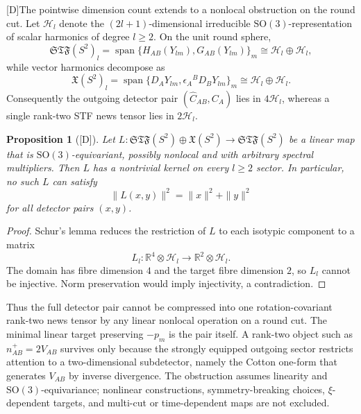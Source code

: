 \documentclass[11pt,a4paper]{article}
\newtheorem{proposition}[theorem]{Proposition}
\newcommand{\statusD}{\textsf{[D]}}
\begin{document}
\statusD The pointwise dimension count extends to a nonlocal obstruction on the round cut.  Let \(\mathcal H_l\) denote the \((2l+1)\)-dimensional irreducible \(\mathrm{SO}(3)\)-representation of scalar harmonics of degree \(l\ge2\).  On the unit round sphere,
\begin{equation}
  \mathfrak{STF}(S^2)_l
  =
  \operatorname{span}\{H_{AB}(Y_{lm}),G_{AB}(Y_{lm})\}_{m}
  \cong
  \mathcal H_l\oplus\mathcal H_l ,
\end{equation}
while vector harmonics decompose as
\begin{equation}
  \mathfrak{X}(S^2)_l
  =
  \operatorname{span}\{D_AY_{lm},\epsilon_A{}^BD_BY_{lm}\}_{m}
  \cong
  \mathcal H_l\oplus\mathcal H_l .
\end{equation}
Consequently the outgoing detector pair \((\hat C_{AB},C_A)\) lies in \(4\mathcal H_l\), whereas a single rank-two STF news tensor lies in \(2\mathcal H_l\).

\begin{proposition}[\statusD]
Let \(L:\mathfrak{STF}(S^2)\oplus\mathfrak{X}(S^2)\to\mathfrak{STF}(S^2)\) be a linear map that is \(\mathrm{SO}(3)\)-equivariant, possibly nonlocal and with arbitrary spectral multipliers.  Then \(L\) has a nontrivial kernel on every \(l\ge2\) sector.  In particular, no such \(L\) can satisfy
\begin{equation}
  \|L(x,y)\|^2=\|x\|^2+\|y\|^2
\end{equation}
for all detector pairs \((x,y)\).
\end{proposition}
\begin{proof}
Schur's lemma reduces the restriction of \(L\) to each isotypic component to a matrix
\begin{equation}
  L_l:\mathbb R^4\otimes\mathcal H_l\longrightarrow\mathbb R^2\otimes\mathcal H_l .
\end{equation}
The domain has fibre dimension \(4\) and the target fibre dimension \(2\), so \(L_l\) cannot be injective.  Norm preservation would imply injectivity, a contradiction.
\end{proof}

Thus the full detector pair cannot be compressed into one rotation-covariant rank-two news tensor by any linear nonlocal operation on a round cut.  The minimal linear target preserving \(-p_m\) is the pair itself.  A rank-two object such as \(n^+_{AB}=2V_{AB}\) survives only because the strongly equipped outgoing sector restricts attention to a two-dimensional subdetector, namely the Cotton one-form that generates \(V_{AB}\) by inverse divergence.  The obstruction assumes linearity and \(\mathrm{SO}(3)\)-equivariance; nonlinear constructions, symmetry-breaking choices, \(\xi\)-dependent targets, and multi-cut or time-dependent maps are not excluded.
\end{document}
